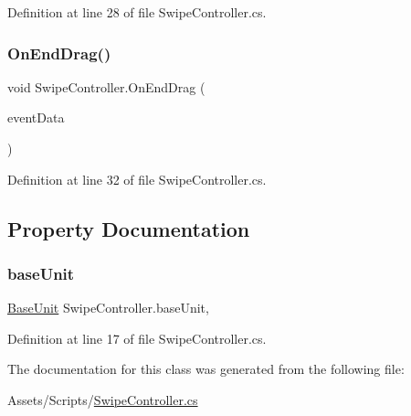 Definition at line 28 of file Swipe\+Controller.\+cs.

\mbox{\label{class_swipe_controller_a59530aa6a8d5a2de12d7f39851ce3d2b}} 
\subsubsection{\texorpdfstring{OnEndDrag()}{OnEndDrag()}}
{\footnotesize\ttfamily void Swipe\+Controller.\+On\+End\+Drag (\begin{DoxyParamCaption}\item[{Pointer\+Event\+Data}]{event\+Data }\end{DoxyParamCaption})}



Definition at line 32 of file Swipe\+Controller.\+cs.



\subsection{Property Documentation}
\mbox{\label{class_swipe_controller_a422f7e579179be4a1e6e198d97068cc2}} 
\subsubsection{\texorpdfstring{baseUnit}{baseUnit}}
{\footnotesize\ttfamily \mbox{\hyperlink{class_base_unit}{Base\+Unit}} Swipe\+Controller.\+base\+Unit\hspace{0.3cm}{\ttfamily [get]}, {\ttfamily [set]}}



Definition at line 17 of file Swipe\+Controller.\+cs.



The documentation for this class was generated from the following file\+:\begin{DoxyCompactItemize}
\item 
Assets/\+Scripts/\mbox{\hyperlink{_swipe_controller_8cs}{Swipe\+Controller.\+cs}}\end{DoxyCompactItemize}
